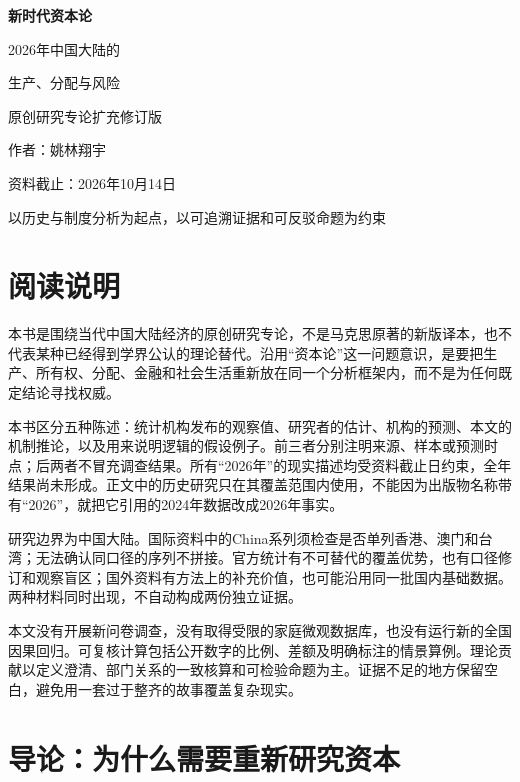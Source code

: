 \documentclass[UTF8,fontset=fandol,zihao=-4,oneside,openany]{ctexbook}
\begin{document}
\frontmatter
\hypersetup{pageanchor=false}
\begin{titlepage}
\centering\vspace*{28mm}
{\Huge\bfseries 新时代资本论\par}
\vspace{12mm}
{\LARGE 2026年中国大陆的\par 生产、分配与风险\par}
\vspace{22mm}
{\large 原创研究专论\quad 扩充修订版\par}
\vspace{8mm}
{\large 作者：姚林翔宇\par}
\vfill
{\large 资料截止：2026年10月14日\par}
\vspace{8mm}
{\small 以历史与制度分析为起点，以可追溯证据和可反驳命题为约束\par}
\end{titlepage}
\hypersetup{pageanchor=true}
\chapter*{阅读说明}
本书是围绕当代中国大陆经济的原创研究专论，不是马克思原著的新版译本，也不代表某种已经得到学界公认的理论替代。沿用“资本论”这一问题意识，是要把生产、所有权、分配、金融和社会生活重新放在同一个分析框架内，而不是为任何既定结论寻找权威。

本书区分五种陈述：统计机构发布的观察值、研究者的估计、机构的预测、本文的机制推论，以及用来说明逻辑的假设例子。前三者分别注明来源、样本或预测时点；后两者不冒充调查结果。所有“2026年”的现实描述均受资料截止日约束，全年结果尚未形成。正文中的历史研究只在其覆盖范围内使用，不能因为出版物名称带有“2026”，就把它引用的2024年数据改成2026年事实。

研究边界为中国大陆。国际资料中的China系列须检查是否单列香港、澳门和台湾；无法确认同口径的序列不拼接。官方统计有不可替代的覆盖优势，也有口径修订和观察盲区；国外资料有方法上的补充价值，也可能沿用同一批国内基础数据。两种材料同时出现，不自动构成两份独立证据。

本文没有开展新问卷调查，没有取得受限的家庭微观数据库，也没有运行新的全国因果回归。可复核计算包括公开数字的比例、差额及明确标注的情景算例。理论贡献以定义澄清、部门关系的一致核算和可检验命题为主。证据不足的地方保留空白，避免用一套过于整齐的故事覆盖复杂现实。

\tableofcontents
\mainmatter
\chapter*{导论：为什么需要重新研究资本}
\end{document}
